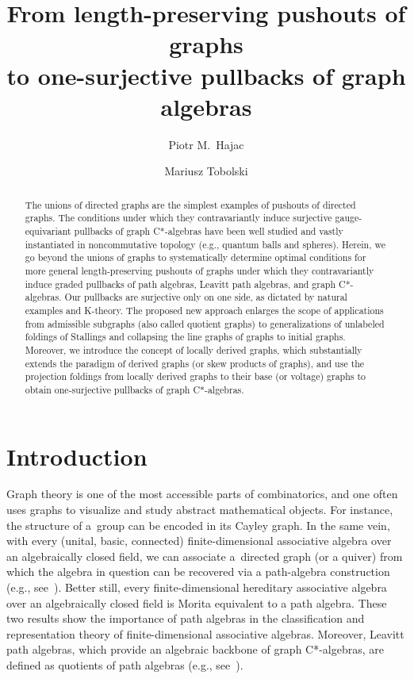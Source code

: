 \documentclass[12pt,times,a4paper]{amsart}
\title[From pushouts of graphs to pullbacks of graph algebras]{\vspace*{-15mm} From length-preserving pushouts of graphs\\
 to one-surjective pullbacks of graph algebras}
\author[P. M.~Hajac]{Piotr M.~Hajac}
\author[M.~Tobolski]{Mariusz Tobolski}
\numberwithin{equation}{section}
\numberwithin{equation}{section}
\begin{document}
\baselineskip14.5pt
\begin{abstract}%
The unions of directed graphs are the simplest examples of pushouts of directed graphs. The conditions under which 
they contravariantly induce surjective gauge-equivariant pullbacks of graph C*-algebras have been well
studied and vastly instantiated in noncommutative topology (e.g., quantum balls and spheres).
Herein, we go beyond the unions of graphs to systematically determine optimal conditions for more 
general length-preserving pushouts 
of graphs under which
they contravariantly induce graded pullbacks of path algebras, Leavitt path algebras, and  graph C*-algebras.
Our pullbacks are surjective only on one side, as dictated by natural examples and K-theory.
The proposed new approach enlarges the scope of applications from 
admissible subgraphs (also called quotient graphs) to generalizations of unlabeled foldings of Stallings and collapsing
the line graphs of graphs to initial graphs. Moreover, we introduce the concept of locally derived graphs, which substantially extends
 the paradigm of derived graphs (or skew products of graphs), and use the projection foldings from locally derived graphs to their base (or voltage) graphs
 to obtain one-surjective pullbacks of graph C*-algebras.
\end{abstract}
\maketitle
\vspace*{-10mm}
{\tableofcontents}
\parskip3.5mm



\section{Introduction}
\noindent
Graph theory is one of the most accessible parts of combinatorics, and one often uses graphs to visualize and study abstract 
mathematical objects. For instance, the structure of a~group can be encoded in its Cayley graph. In the same vein, with every 
(unital, basic, connected) finite-dimensional associative algebra over an algebraically closed field, we can associate a~directed graph 
(or a quiver) from which the algebra in question can be recovered via a path-algebra construction (e.g., see~\cite{ass06}). 
Better still, every finite-dimensional hereditary associative algebra over an algebraically closed field is Morita equivalent to a path 
algebra. These two results show the importance of path algebras in the classification and representation theory of finite-dimensional 
associative algebras. Moreover, Leavitt path algebras, which provide an algebraic backbone of graph C*-algebras, are defined
as quotients of path algebras (e.g., see~\cite{aasm17}).
\end{document}
